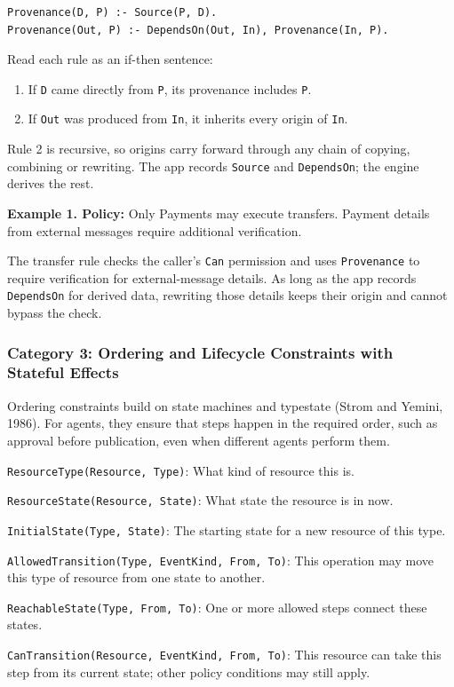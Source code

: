\documentclass[10pt,letterpaper]{article}
\newcommand{\pred}[2]{\texttt{#1}: #2\par}
\begin{document}
\begin{lstlisting}
Provenance(D, P) :- Source(P, D).
Provenance(Out, P) :- DependsOn(Out, In), Provenance(In, P).
\end{lstlisting}
Read each rule as an if-then sentence:
\begin{enumerate}
\item If \texttt{D} came directly from \texttt{P}, its provenance includes \texttt{P}.
\item If \texttt{Out} was produced from \texttt{In}, it inherits every origin of \texttt{In}.
\end{enumerate}
Rule 2 is recursive, so origins carry forward through any chain of copying,
combining or rewriting. The app records \texttt{Source} and \texttt{DependsOn};
the engine derives the rest.

\begin{originalpolicy}
\textbf{Example 1. Policy:} Only Payments may execute transfers. Payment details from
external messages require additional verification.
\end{originalpolicy}
The transfer rule checks the caller's \texttt{Can} permission and uses
\texttt{Provenance} to require verification for external-message details.
As long as the app records \texttt{DependsOn} for derived data, rewriting
those details keeps their origin and cannot bypass the check.

\subsubsection{Category 3: Ordering and Lifecycle Constraints with Stateful Effects}
\label{sec:cat-lc}

Ordering constraints build on state machines and typestate (Strom and Yemini,
1986). For agents, they ensure that steps happen in the required order, such
as approval before publication, even when different agents perform them.

\pred{ResourceType(Resource, Type)}{What kind of resource this is.}
\pred{ResourceState(Resource, State)}{What state the resource is in now.}
\pred{InitialState(Type, State)}{The starting state for a new resource of this type.}
\pred{AllowedTransition(Type, EventKind, From, To)}{This operation may move
this type of resource from one state to another.}
\pred{ReachableState(Type, From, To)}{One or more allowed steps connect these states.}
\pred{CanTransition(Resource, EventKind, From, To)}{This resource can take
this step from its current state; other policy conditions may still apply.}
\end{document}
